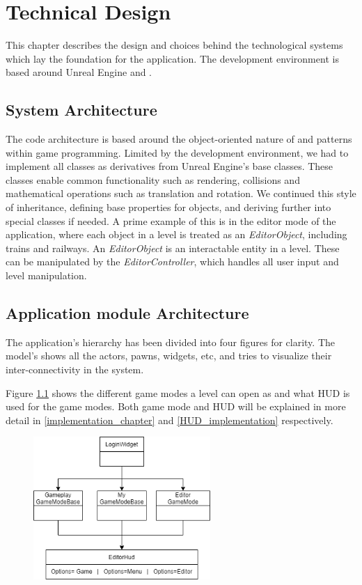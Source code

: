 \chapter{Technical Design}

This chapter describes the design and choices behind the technological systems which lay the foundation for the application. The development environment is based around Unreal Engine and \cpp.

\section{System Architecture}

The code architecture is based around the object-oriented nature of \cpp and patterns within game programming. Limited by the development environment, we had to implement all classes as derivatives from Unreal Engine's base classes. These classes enable common functionality such as rendering, collisions and mathematical operations such as translation and rotation. We continued this style of inheritance, defining base properties for objects, and deriving further into special classes if needed. A prime example of this is in the editor mode of the application, where each object in a level is treated as an \textit{EditorObject}, including trains and railways. An \textit{EditorObject} is an interactable entity in a level. These can be manipulated by the \textit{EditorController}, which handles all user input and level manipulation.

\section{Application module Architecture}
The application's hierarchy has been divided into four figures for clarity. The model's shows all the actors, pawns, widgets, etc, and tries to visualize their inter-connectivity in the system.

Figure \ref{LoginHierFigure} shows the different game modes a level can open as and what HUD is used for the game modes. Both game mode and HUD will be explained in more detail in \ref{implementation_chapter} and \ref{HUD_implementation} respectively.

\begin{figure}[H]
    \centerline{\includegraphics[width=0.6\textwidth]{figures/Untitled Diagram-Login.drawio.png}}
    \caption[Hierarchy of application start up functionality ]{ }
    \label{LoginHierFigure}
\end{figure} 

